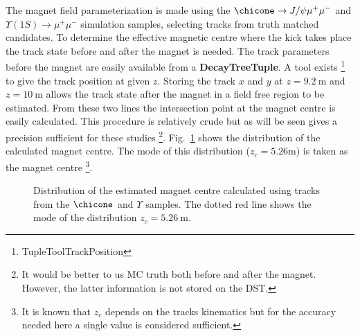 The magnet field parameterization is made using the  $\chicone \rightarrow J/\psi \mu^+ \mu^-$ and $\Upsilon(1S) \rightarrow
\mu^+ \mu^-$ simulation samples, selecting tracks from truth matched
candidates. To determine the effective magnetic
centre where the kick takes place the track state before and after the
magnet is needed. The track parameters before the magnet are easily
available from a \textbf{DecayTreeTuple}. A tool exists \footnote{TupleToolTrackPosition} to give
 the track position at given $z$. Storing the track $x$ and $y$ at $z
 = 9.2~\textrm{m} $ and $z
 = 10~\textrm{m}$ allows the track state after the magnet in a field
 free region to be estimated. From these two lines the intersection
 point at the magnet centre is easily calculated. This procedure is
 relatively crude but as will be seen gives a precision sufficient
 for these studies \footnote{It would be better to us MC truth both
   before and after the magnet. However, the latter information is not
 stored on the DST.}. Fig.~\ref{fig:zc} shows the
 distribution of the calculated magnet centre. The mode of this
 distribution ($z_c = 5.26 \textrm{m}$) is taken as the magnet centre
 \footnote{It is known that $z_c$ depends on the tracks kinematics but
   for the accuracy needed here a single value is
   considered sufficient. }.
\begin{figure}[htb!]
\begin{center}
\caption{\small Distribution of the estimated magnet centre calculated
  using tracks from the $\chicone$ and $\Upsilon$ samples. The
  dotted red line shows the mode of the distribution $z_c = 5.26~\textrm{m}$. }
\label{fig:zc}
\end{center}
\end{figure}

